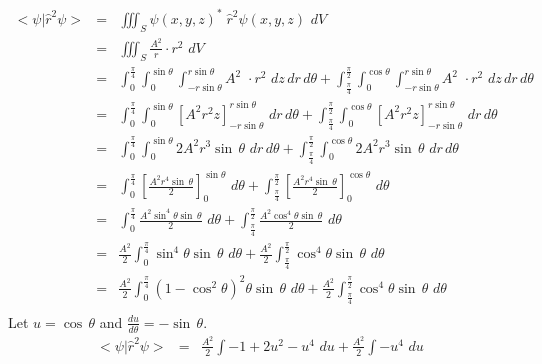 \documentclass{article}
\begin{document}
\vspace{2cm}

\subsection{}%
\large{
\begin{eqnarray*}
        <\psi|\hat{r}^2\psi> &=&  \iiint_S \psi(x,y,z)^*\;\hat{r}^2\psi(x,y,z) \,\, dV\\
        &=& \iiint_S\frac{A^2}{r} \cdot r^2 \,\, dV\\
        &=&\int_{0}^{\frac{\pi}{4}}\int_{0}^{\sin\theta}\int_{-r\sin\theta}^{r\sin\theta} A^2 \,\, \cdot r^2\,\,dz\,dr\,d\theta + \int_{\frac{\pi}{4}}^{\frac{\pi}{2}}\int_{0}^{\cos\theta}\int_{-r\sin\theta}^{r\sin\theta} A^2 \,\, \cdot r^2\,\,dz\,dr\,d\theta \\
        &=& \int_{0}^{\frac{\pi}{4}} \int_{0}^{\sin\theta} [A^2 r^2z]_{-r\sin\theta}^{r\sin\theta} \,\,dr\,d\theta + \int_{\frac{\pi}{4}}^{\frac{\pi}{2}}\int_{0}^{\cos\theta}  [A^2r^2 z]_{-r\sin\theta}^{r\sin\theta} \,\,dr\,d\theta\\
        &=& \int_{0}^{\frac{\pi}{4}} \int_{0}^{\sin\theta} 2A^2 r^3 \sin\,\theta \,\,dr\,d\theta + \int_{\frac{\pi}{4}}^{\frac{\pi}{2}}\int_{0}^{\cos\theta}  2A^2 r^3 \sin\,\theta  \,\,dr\,d\theta \\
        &=& \int_{0}^{\frac{\pi}{4}} [\frac{A^2 r^4\sin\,\theta}{2}]_{0}^{\sin\theta}  \,\,d\theta + \int_{\frac{\pi}{4}}^{\frac{\pi}{2}}  [\frac{A^2 r^4\sin\,\theta}{2}]_{0}^{\cos\theta}  \,\,d\theta \\
        &=& \int_{0}^{\frac{\pi}{4}} \frac{A^2 \sin^4\theta \sin\,\theta}{2}  \,\,d\theta + \int_{\frac{\pi}{4}}^{\frac{\pi}{2}} \frac{ A^2 \cos^4\theta \sin\,\theta }{2}  \,\,d\theta \\
        &=& \frac{A^2 }{2} \int_{0}^{\frac{\pi}{4}}  \sin^4\theta \sin\,\theta \,\,d\theta + \frac{ A^2 }{2}\int_{\frac{\pi}{4}}^{\frac{\pi}{2}}  \cos^4\theta \sin\,\theta  \,\,d\theta \\
        &=& \frac{A^2 }{2} \int_{0}^{\frac{\pi}{4}}  (1-\cos^2\theta)^2\theta \sin\,\theta \,\,d\theta + \frac{ A^2 }{2}\int_{\frac{\pi}{4}}^{\frac{\pi}{2}}  \cos^4\theta \sin\,\theta  \,\,d\theta \\
\end{eqnarray*}
Let $u=\cos\,\theta$ and $\frac{du}{d\theta} = -\sin\,\theta$.
\begin{eqnarray*}
        <\psi|\hat{r}^2\psi> &=&\frac{A^2 }{2} \int -1 + 2u^2 - u^4 \,\, du +\frac{A^2 }{2} \int -u^4 \,\,du\\

\end{eqnarray*}}
\end{document}
